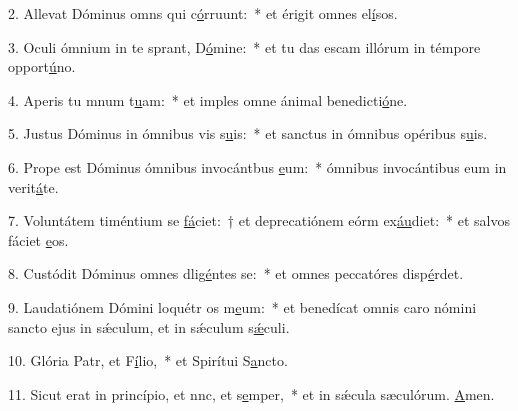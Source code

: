 2. Allevat Dóminus omns qui c\uline{ó}rruunt:~* et érigit omnes el\uline{í}sos.\par 
3. Oculi ómnium in te sprant, D\uline{ó}mine:~* et tu das escam illórum in témpore opport\uline{ú}no.\par 
4. Aperis tu mnum t\uline{u}am:~* et imples omne ánimal benedicti\uline{ó}ne.\par 
5. Justus Dóminus in ómnibus vis s\uline{u}is:~* et sanctus in ómnibus opéribus s\uline{u}is.\par 
6. Prope est Dóminus ómnibus invocántbus \uline{e}um:~* ómnibus invocántibus eum in verit\uline{á}te.\par 
7. Voluntátem timéntium se \uline{fá}ciet:~† et deprecatiónem eórm ex\uline{áu}diet:~* et salvos fáciet \uline{e}os.\par 
8. Custódit Dóminus omnes dlig\uline{é}ntes se:~* et omnes peccatóres disp\uline{é}rdet.\par 
9. Laudatiónem Dómini loquétr os m\uline{e}um:~* et benedícat omnis caro nómini sancto ejus in sǽculum, et in sǽculum s\uline{ǽ}culi.\par 
10. Glória Patr, et F\uline{í}lio,~* et Spirítui S\uline{a}ncto.\par 
11. Sicut erat in princípio, et nnc, et s\uline{e}mper,~* et in sǽcula sæculórum. \uline{A}men.\par 
